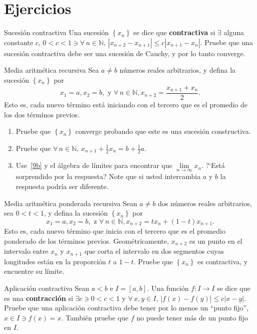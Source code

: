 \section*{Ejercicios}
\begin{prob}{Sucesión contractiva}
	Una sucesión $\left\{x_{n}\right\}$ se dice que \textbf{contractiva} si $\exists$ alguna constante $c$, $0<c<1\ni\forall\,n\in\mathds{N}$, $|x_{n+2}-x_{n+1}|\leq c|x_{n+1}-x_{n}|$. Pruebe que una sucesión contractiva debe ser una sucesión de Cauchy, y por lo tanto converge.
\end{prob}

\begin{prob}{Media aritmética recursiva}
Sea $a\neq b$ números reales arbitrarios, y defina la sucesión $\left\{x_{n}\right\}$ por \[ x_{1}=a,x_{2}=b,\text{ y }\forall\,n\in\mathds{N},x_{n+2}=\frac{x_{n+1}+x_{n}}{2}. \] Esto es, cada nuevo término está iniciando con el tercero que es el promedio de los dos términos previos.
	\begin{enumerate}
		\item Pruebe que $\left\{x_{n}\right\}$ converge probando que este es una sucesión constructiva.
		\item Pruebe que $\forall\,n\in\mathds{N}$, $x_{n+1}+\frac{1}{2}x_{n}=b+\frac{1}{2}a$.\label{9b}
		\item Use~\ref{9b} y el álgebra de límites para encontrar que  $\lim\limits_{n\to\infty}x_{n}$. ?`Está sorprendido por la respuesta? Note que si usted intercambia $a$ y $b$ la respuesta podría ser diferente.
	\end{enumerate}
\end{prob}

\begin{prob}{Media aritmética ponderada recursiva}
	Sean $a\neq b$ dos números reales arbitrarios, sea $0<t<1$, y defina la sucesión $\left\{x_{n}\right\}$ por \[ x_{1}=a,x_{2}=b,\text{ z }\forall\,n\in\mathds{N},x_{n+2}=tx_{n}+\left(1-t\right)x_{n+1}. \] Esto es, cada nuevo término que inicia con el tercero que es el promedio ponderado de los términos previos. Geométricamente, $x_{n+2}$ es un punto en el intervalo entre $x_{n}$ y $x_{n+1}$ que corta el intervalo en dos segmentos cuyas longitudes están en la proporción $t$ a $1-t$. Pruebe que $\left\{x_{n}\right\}$ es contractiva, y encuentre su límite.
\end{prob}

\begin{prob}{Aplicación contractiva}
	Sean $a<b$ e $I=\left[a,b\right]$. Una función $f\colon I\rightarrow I$ se dice que es una \textbf{contracción} si $\exists c\ni0<c<1$ y $\forall\,x,y\in I$, $|f\left(x\right)-f\left(y\right)|\leq c|x-y|$. Pruebe que una aplicación contractiva debe tener por lo menos un ``punto fijo'', $x\in I\ni f\left(x\right)=x$. También pruebe que $f$ no puede tener más de un punto fijo en $I$.
\end{prob}

